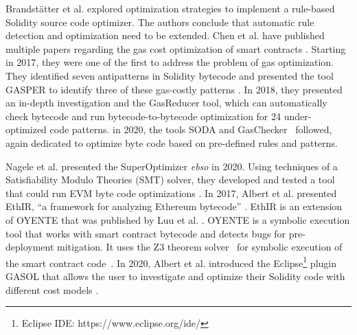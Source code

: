 \documentclass[10pt,conference]{IEEEtran}
\begin{document}
	
	Brandstätter et al. \cite{brandstatter} explored optimization strategies to implement a rule-based Solidity source code optimizer. The authors conclude that automatic rule detection and optimization need to be extended. Chen et al. have published multiple papers regarding the gas cost optimization of smart contracts \cite{chen1devour, chen2gaschecker, chen3soda, chen4stan}. Starting in 2017, they were one of the first to address the problem of gas optimization. They identified seven antipatterns in Solidity bytecode and presented the tool GASPER to identify three of these gas-costly patterns \cite{chen1devour}. In 2018, they presented an in-depth investigation and the GasReducer tool, which can automatically check bytecode and run bytecode-to-bytecode optimization for 24 under-optimized code patterns. in 2020, the tools SODA \cite{chen3soda} and GasChecker~\cite{chen2gaschecker} followed, again dedicated to optimize byte code based on pre-defined rules and patterns. 
	
	Nagele et al. presented the SuperOptimizer \textit{ebso} in 2020. Using techniques of a Satisfiability Modulo Theories (SMT) solver, they developed and tested a tool that could run EVM byte code optimizations \cite{nagele}. In 2017, Albert et al. presented EthIR, ``a framework for analyzing Ethereum bytecode'' \cite{ethir}. EthIR is an extension of OYENTE that was published by Luu et al. \cite{oyente}. OYENTE is a symbolic execution tool that works with smart contract bytecode and detects bugs for pre-deployment mitigation. It uses the Z3 theorem solver~\cite{z3solver} for symbolic execution of the smart contract code~\cite{oyente}. In 2020, Albert et al. introduced the Eclipse\footnote{Eclipse IDE: https://www.eclipse.org/ide/} plugin GASOL that allows the user to investigate and optimize their Solidity code with different cost models \cite{gasol}.
	
\end{document}
